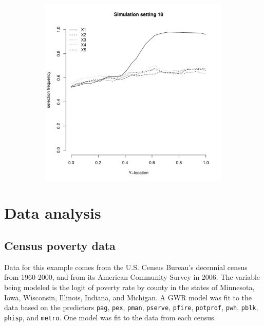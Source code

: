 \documentclass[authoryear, review, 11pt]{elsarticle}
\begin{document}
\begin{figure}
\begin{subfigure}[b]{0.3\textwidth}
			\label{fig:tiger}
		\end{subfigure}
        ~ %
		\begin{subfigure}[b]{0.3\textwidth}
			\centering
			\includegraphics[width=\textwidth]{../../figures/simulation/28-18-profile-selection.pdf}
			\label{fig:mouse}
		\end{subfigure}
	\end{figure}	
		
\section{Data analysis}
	\subsection{Census poverty data}
	Data for this example comes from the U.S. Census Bureau's decennial census from 1960-2000, and from its American Community Survey in 2006. The variable being modeled is the logit of poverty rate by county in the states of Minnesota, Iowa, Wisconsin, Illinois, Indiana, and Michigan. A GWR model was fit to the data based on the predictors \verb!pag!, \verb!pex!, \verb!pman!, \verb!pserve!, \verb!pfire!, \verb!potprof!, \verb!pwh!, \verb!pblk!, \verb!phisp!, and \verb!metro!. One model was fit to the data from each census.
	
\end{document}
